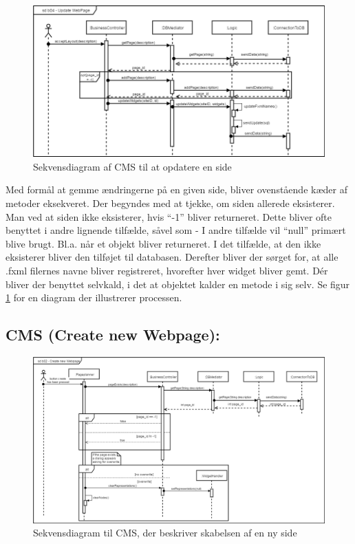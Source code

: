 \begin{figure}[H]
  \includegraphics[width=\linewidth]{elaborationsdokumentet/figurer/analyse/Update_Webpage.png}
  \caption{Sekvensdiagram af CMS til at opdatere en side}
  \label{fig:Sekvensdiagram-CMS-Opdatesite}
\end{figure}

Med formål at gemme ændringerne på en given side, bliver ovenstående kæder af metoder eksekveret. Der begyndes med at tjekke, om siden allerede eksisterer. Man ved at siden ikke eksisterer, hvis “-1” bliver returneret. Dette bliver ofte benyttet i andre lignende tilfælde, såvel som - I andre tilfælde vil “null” primært blive brugt. Bl.a. når et objekt bliver returneret.
I det tilfælde, at den ikke eksisterer bliver den tilføjet til databasen.
Derefter bliver der sørget for, at alle .fxml filernes navne bliver registreret, hvorefter hver widget bliver gemt. Dér bliver der benyttet selvkald, i det at objektet kalder en metode i sig selv. Se figur \ref{fig:Sekvensdiagram-CMS-Opdatesite} for en diagram der illustrerer processen.

\subsection{CMS (Create new Webpage):}

\begin{figure}[H]
  \includegraphics[width=\linewidth]{elaborationsdokumentet/figurer/analyse/Create_new_Webpage.png}
  \caption{Sekvensdiagram til CMS, der beskriver skabelsen af en ny side}
  \label{fig:Sekvensdiagram-CMS-createSite}
\end{figure}

